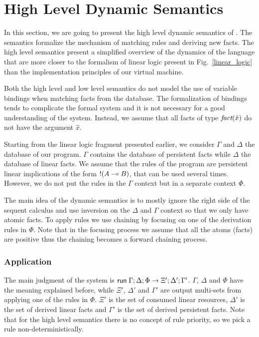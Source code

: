 \section{High Level Dynamic Semantics}

In this section, we are going to present the high level dynamic semantics of \lang. The semantics
formalize the mechanism of matching rules and deriving new facts. The high level semantics
present a simplified overview of the dynamics of the language that are more closer to the formalism
of linear logic present in Fig.~\ref{linear_logic} than the implementation principles of our
virtual machine.

Both the high level and low level semantics do not model the use of variable bindings when matching
facts from the database. The formalization of bindings tends to complicate the formal system and it is not
necessary for a good understanding of the system. Instead, we assume that all facts of
type $\emph{fact}(\hat{x})$ do not have the argument $\hat{x}$.

Starting from the linear logic fragment presented earlier, we consider $\Gamma$ and $\Delta$ the database
of our program. $\Gamma$ contains the database of persistent facts while $\Delta$ the database of linear
facts. We assume that the rules of the program are persistent linear implications of the form
${!} (A \multimap B)$, that can be used several times. However, we do not put the rules in the $\Gamma$
context but in a separate context $\Phi$.

The main idea of the dynamic semantics is to mostly ignore the right side of the sequent calculus
and use inversion on the $\Delta$ and $\Gamma$ context so that we only have atomic facts.
To apply rules we use chaining by focusing on one of the derivation rules in $\Phi$. Note
that in the focusing process we assume that all the atoms (facts) are positive thus the chaining
becomes a forward chaining process.

\subsubsection{Application}

The main judgment of the system is $\mathsf{run} \; \Gamma; \Delta; \Phi \rightarrow \Xi'; \Delta'; \Gamma'$.
$\Gamma$, $\Delta$ and $\Phi$ have the meaning explained before, while $\Xi'$, $\Delta'$ and $\Gamma'$
are output multi-sets from applying one of the rules in $\Phi$. $\Xi'$ is the set of consumed linear
resources, $\Delta'$ is the set of derived linear facts and $\Gamma'$ is the set of derived persistent
facts. Note that for the high level semantics there is no concept of rule priority, so we pick a rule
non-deterministically.

